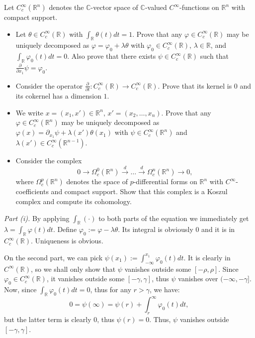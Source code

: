 \documentclass{category-template}
\begin{document}
\begin{problem}
    Let $C_c^{\infty}(\mathbb{R}^n)$ denotes the $\mathbb{C}$-vector 
    space of $\mathbb{C}$-valued $C^{\infty}$-functions on $\mathbb{R}^n$
    with compact support. 
    \begin{itemize}
        \item[(i)] Let $\theta \in C_c^{\infty}(\mathbb{R})$ with
        $\int_{\mathbb{R}}\theta(t)dt=1$. Prove that any $\varphi \in
        C_c^{\infty}(\mathbb{R})$ may be uniquely decomposed as $\varphi =
        \varphi_0 + \lambda\theta$ with $\varphi_0 \in
        C_c^{\infty}(\mathbb{R})$, $\lambda \in \mathbb{R}$, and
        $\int_{\mathbb{R}}\varphi_0(t)dt=0$. Also prove that there exists $\psi
        \in C_c^{\infty}(\mathbb{R})$ such that $\frac{\partial}{\partial
        x_1}\psi = \varphi_0$.
        \item[(ii)] Consider the operator $\frac{\partial}{\partial t}:
        C_c^{\infty}(\mathbb{R}) \to C_c^{\infty}(\mathbb{R})$. Prove that 
        its kernel is $0$ and its cokernel has a dimension $1$.
        \item[(iii)] We write $x=(x_1,x') \in \mathbb{R}^n$,
        $x'=(x_2,\dots,x_n)$. Prove that any $\varphi \in
        C_c^{\infty}(\mathbb{R}^n)$ may be uniquely decomposed as $\varphi(x) =
        \partial_{x_1}\psi + \lambda(x')\theta(x_1)$ with $\psi \in
        C_c^{\infty}(\mathbb{R}^n)$ and $\lambda(x') \in
        C_c^{\infty}(\mathbb{R}^{n-1})$.
        \item[(iv)] Consider the complex
        \begin{equation*}
            0 \to \Omega_c^0(\mathbb{R}^n) \xrightarrow{d} \dots \xrightarrow{d} \Omega_c^n(\mathbb{R}^n) \to 0,
        \end{equation*}
        where $\Omega_c^p(\mathbb{R}^n)$ denotes the space of $p$-differential
        forms on $\mathbb{R}^n$ with $C^{\infty}$-coefficients and compact
        support. Show that this complex is a Koszul complex and compute its
        cohomology.
    \end{itemize}
\end{problem}

\textit{Part (i).} By applying $\int_{\mathbb{R}}(\cdot)$ to both parts of the
equation we immediately get $\lambda=\int_{\mathbb{R}}\varphi(t)dt$. Define
$\varphi_0 := \varphi - \lambda\theta$. Its integral is obviously $0$ and it is
in $C_c^{\infty}(\mathbb{R})$. Uniqueness is obvious.

On the second part, we can pick $\psi(x_1) :=
\int_{-\infty}^{x_1}\varphi_0(t)dt$. It is clearly in $C^{\infty}(\mathbb{R})$,
so we shall only show that $\psi$ vanishes outside some $[-\rho,\rho]$. Since
$\varphi_0 \in C_c^{\infty}(\mathbb{R})$, it vanishes outside some
$[-\gamma,\gamma]$, thus $\psi$ vanishes over $(-\infty,-\gamma]$. Now, since
$\int_{\mathbb{R}}\varphi_0(t)dt=0$, thus for any $r>\gamma$, we have:
\begin{equation*}
    0 = \psi(\infty) = \psi(r) + \int_{r}^{\infty}\varphi_0(t)dt,
\end{equation*}
but the latter term is clearly $0$, thus $\psi(r)=0$. Thus, $\psi$ vanishes
outside $[-\gamma,\gamma]$.
\end{document}
